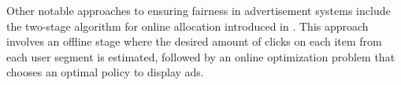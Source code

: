 Other notable approaches to ensuring fairness in advertisement systems include the two-stage algorithm for online allocation introduced in \cite{Li2024}. This approach involves an offline stage where the desired amount of clicks on each item from each user segment is estimated, followed by an online optimization problem that chooses an optimal policy to display ads.
